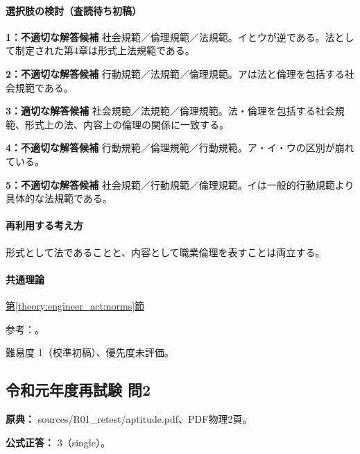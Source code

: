 \paragraph{選択肢の検討（査読待ち初稿）}\mbox{}\par

\noindent\textbf{1：不適切な解答候補} 社会規範／倫理規範／法規範。イとウが逆である。法として制定された第4章は形式上法規範である。\par

\noindent\textbf{2：不適切な解答候補} 行動規範／法規範／倫理規範。アは法と倫理を包括する社会規範である。\par

\noindent\textbf{3：適切な解答候補} 社会規範／法規範／倫理規範。法・倫理を包括する社会規範、形式上の法、内容上の倫理の関係に一致する。\par

\noindent\textbf{4：不適切な解答候補} 行動規範／倫理規範／行動規範。ア・イ・ウの区別が崩れている。\par

\noindent\textbf{5：不適切な解答候補} 社会規範／行動規範／倫理規範。イは一般的行動規範より具体的な法規範である。\par

\paragraph{再利用する考え方} 形式として法であることと、内容として職業倫理を表すことは両立する。

\paragraph{共通理論} \hyperref[theory:engineer_act:norms]{第\ref*{theory:engineer_act:norms}節}

\par 参考：\cite{engineer_act_current}。

\par 難易度 1（校準初稿）、優先度未評価。

\subsection{令和元年度再試験 問2}
\label{q:r01-ret-apt-02}

\noindent\textbf{原典：} sources/R01\_retest/aptitude.pdf、PDF物理2頁。

\textbf{公式正答：} 3（single）。

